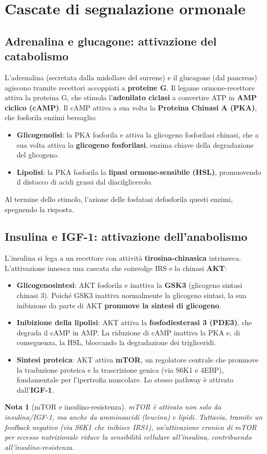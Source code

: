 \documentclass[12pt,a4paper]{report}
\newtheorem{nota}{Nota}[section]
\begin{document}
\section{Cascate di segnalazione ormonale}
\subsection{Adrenalina e glucagone: attivazione del catabolismo}
L'adrenalina (secretata dalla midollare del surrene) e il glucagone (dal pancreas) agiscono tramite recettori accoppiati a \textbf{proteine G}. Il legame ormone-recettore attiva la proteina G, che stimola l'\textbf{adenilato ciclasi} a convertire ATP in \textbf{AMP ciclico (cAMP)}. Il cAMP attiva a sua volta la \textbf{Proteina Chinasi A (PKA)}, che fosforila enzimi bersaglio:
\begin{itemize}
\item \textbf{Glicogenolisi}: la PKA fosforila e attiva la glicogeno fosforilasi chinasi, che a sua volta attiva la \textbf{glicogeno fosforilasi}, enzima chiave della degradazione del glicogeno.
\item \textbf{Lipolisi}: la PKA fosforila la \textbf{lipasi ormone-sensibile (HSL)}, promuovendo il distacco di acidi grassi dal diacilglicerolo.
\end{itemize}
Al termine dello stimolo, l'azione delle fosfatasi defosforila questi enzimi, spegnendo la risposta.
\subsection{Insulina e IGF-1: attivazione dell'anabolismo}
L'insulina si lega a un recettore con attività \textbf{tirosina-chinasica} intrinseca. L'attivazione innesca una cascata che coinvolge IRS e la chinasi \textbf{AKT}:
\begin{itemize}
\item \textbf{Glicogenosintesi}: AKT fosforila e inattiva la \textbf{GSK3} (glicogeno sintasi chinasi 3). Poiché GSK3 inattiva normalmente la glicogeno sintasi, la sua inibizione da parte di AKT \textbf{promuove la sintesi di glicogeno}.
\item \textbf{Inibizione della lipolisi}: AKT attiva la \textbf{fosfodiesterasi 3 (PDE3)}, che degrada il cAMP in AMP. La riduzione di cAMP inattiva la PKA e, di conseguenza, la HSL, bloccando la degradazione dei trigliceridi.
\item \textbf{Sintesi proteica}: AKT attiva \textbf{mTOR}, un regolatore centrale che promuove la traduzione proteica e la trascrizione genica (via S6K1 e 4EBP), fondamentale per l'ipertrofia muscolare. Lo stesso pathway è attivato dall'\textbf{IGF-1}.
\end{itemize}
\begin{nota}[mTOR e insulino-resistenza]
mTOR è attivato non solo da insulina/IGF-1, ma anche da amminoacidi (leucina) e lipidi. Tuttavia, tramite un feedback negativo (via S6K1 che inibisce IRS1), un'attivazione cronica di mTOR per eccesso nutrizionale riduce la sensibilità cellulare all'insulina, contribuendo all'insulino-resistenza.
\end{nota}
\end{document}

